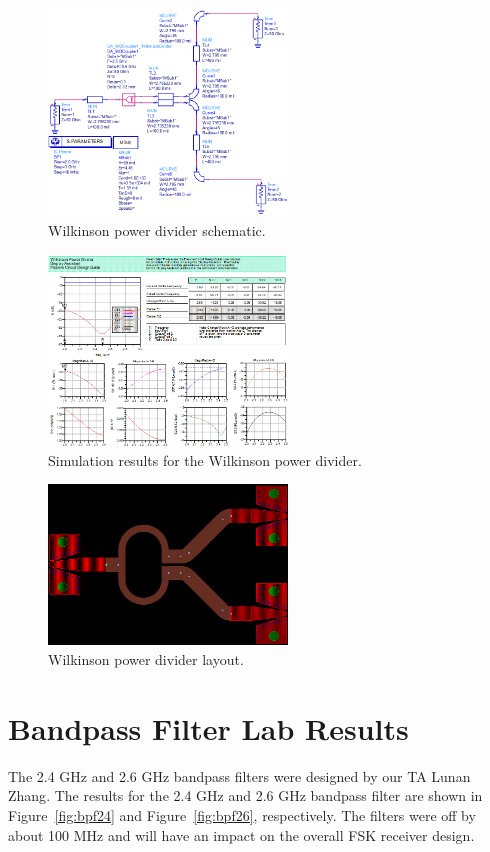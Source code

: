 \documentclass[conference]{IEEEtran}
\begin{document}
\begin{figure}[!htb]
\centering
\includegraphics[width=2.5in]{wilkinson-pics/wilkinson-schematic.png}
\caption{Wilkinson power divider schematic.}
\label{fig:WDSchematic}
\end{figure}

\begin{figure}[!htb]
\centering
\includegraphics[width=2.5in]{wilkinson-pics/wilkinson-simulation.png}
\caption{Simulation results for the Wilkinson power divider.}
\label{fig:WDSim}
\end{figure}

\begin{figure}[!htb]
\centering
\includegraphics[width=2.5in]{wilkinson-pics/wilkinson-layout.png}
\caption{Wilkinson power divider layout.}
\label{fig:WDLayout}
\end{figure}

\section{Bandpass Filter Lab Results}
The 2.4 GHz and 2.6 GHz bandpass filters were designed by our TA Lunan Zhang\cite{lunan}. The results for the 2.4 GHz and 2.6 GHz bandpass filter are shown in Figure~\ref{fig:bpf24} and Figure~\ref{fig:bpf26}, respectively. The filters were off by about 100 MHz and will have an impact on the overall FSK receiver design.
\end{document}
